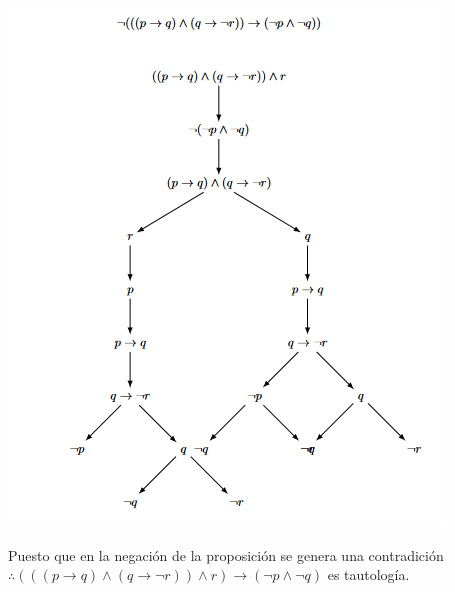 \begin{center}
    \includegraphics[height = 0.25\textheight]{recursos/imagen1.png}\par
\end{center}


Puesto que en la negación de la proposición se genera una contradición 
$\therefore (((p \rightarrow q)\land (q \rightarrow \neg r)) \land r) \rightarrow (\neg p \land \neg q) $ es tautología.\\


